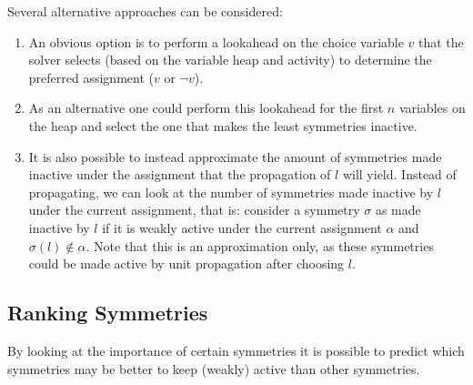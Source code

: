 	Several alternative approaches can be considered:

	\begin{enumerate}
		\item An obvious option is to perform a lookahead on the choice variable $v$ that the solver
			selects (based on the variable heap and activity) to determine the
			preferred assignment ($v$ or $\neg v$).

		\item As an alternative one could perform this lookahead for the first $n$ variables on the
			heap and select the one that makes the least symmetries inactive.

		\item It is also possible to instead approximate the amount of symmetries made inactive under the
			assignment that the propagation of $l$ will yield.
			Instead of propagating, we can look at the number of symmetries made inactive by $l$
			under the current assignment, that is: consider a symmetry $\sigma$ as
			made inactive by $l$ if it is weakly active under the current assignment $\alpha$ and
			$\sigma(l) \notin \alpha$.
			Note that this is an approximation only, as these symmetries could be made active by
			unit propagation after choosing $l$.

	\end{enumerate}
	
\subsection{Ranking Symmetries}
	By looking at the importance of certain symmetries it is possible to predict
	which symmetries may be better to keep (weakly) active than other symmetries.
